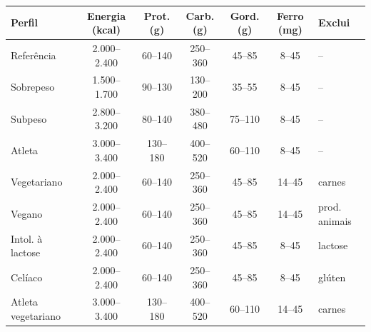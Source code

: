 \begin{tabular}{lcccccl}
\toprule
Perfil & Energia (kcal) & Prot. (g) & Carb. (g) & Gord. (g) & Ferro (mg) & Exclui \\
\midrule
Referência & 2.000--2.400 & 60--140 & 250--360 & 45--85 & 8--45 & -- \\
Sobrepeso & 1.500--1.700 & 90--130 & 130--200 & 35--55 & 8--45 & -- \\
Subpeso & 2.800--3.200 & 80--140 & 380--480 & 75--110 & 8--45 & -- \\
Atleta & 3.000--3.400 & 130--180 & 400--520 & 60--110 & 8--45 & -- \\
Vegetariano & 2.000--2.400 & 60--140 & 250--360 & 45--85 & 14--45 & carnes \\
Vegano & 2.000--2.400 & 60--140 & 250--360 & 45--85 & 14--45 & prod. animais \\
Intol. à lactose & 2.000--2.400 & 60--140 & 250--360 & 45--85 & 8--45 & lactose \\
Celíaco & 2.000--2.400 & 60--140 & 250--360 & 45--85 & 8--45 & glúten \\
Atleta vegetariano & 3.000--3.400 & 130--180 & 400--520 & 60--110 & 14--45 & carnes \\
\bottomrule
\end{tabular}
